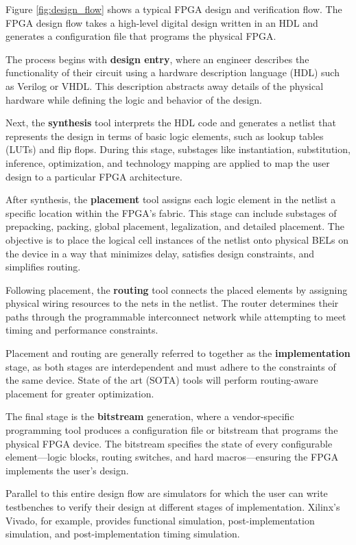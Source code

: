 \documentclass[twocolumn]{article}
\begin{document}
    Figure \ref{fig:design_flow} shows a typical FPGA design and verification flow.
    The FPGA design flow takes a high-level digital design written in an HDL and generates a configuration file that programs the physical FPGA. 

    The process begins with \textbf{design entry}, where an engineer describes the functionality of their circuit using a hardware description language (HDL) such as Verilog or VHDL. This description abstracts away details of the physical hardware while defining the logic and behavior of the design.

    Next, the \textbf{synthesis} tool interprets the HDL code and generates a netlist that represents the design in terms of basic logic elements, such as lookup tables (LUTs) and flip flops. 
    During this stage, substages like instantiation, substitution, inference, optimization, and technology mapping are applied to map the user design to a particular FPGA architecture.

    After synthesis, the \textbf{placement} tool assigns each logic element in the netlist a specific location within the FPGA’s fabric. 
    This stage can include substages of prepacking, packing, global placement, legalization, and detailed placement. 
    The objective is to place the logical cell instances of the netlist onto physical BELs on the device in a way that minimizes delay, satisfies design constraints, and simplifies routing. 

    Following placement, the \textbf{routing} tool connects the placed elements by assigning physical wiring resources to the nets in the netlist. 
    The router determines their paths through the programmable interconnect network while attempting to meet timing and performance constraints.

    Placement and routing are generally referred to together as the \textbf{implementation} stage, as both stages are interdependent and must adhere to the constraints of the same device. 
    State of the art (SOTA) tools will perform routing-aware placement for greater optimization. 

    The final stage is the \textbf{bitstream} generation, where a vendor-specific programming tool produces a configuration file or bitstream that programs the physical FPGA device. 
    The bitstream specifies the state of every configurable element—logic blocks, routing switches, and hard macros—ensuring the FPGA implements the user's design. 

    Parallel to this entire design flow are simulators for which the user can write testbenches to verify their design at different stages of implementation.
    Xilinx's Vivado, for example, provides functional simulation, post-implementation simulation, and post-implementation timing simulation.
\end{document}
